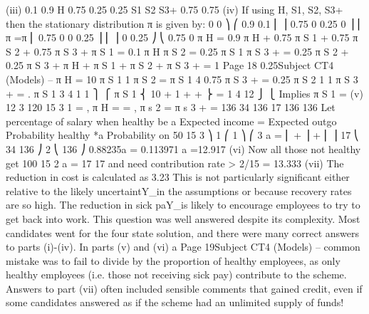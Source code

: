 (iii)
0.1
0.9
H
0.75
0.25
0.25
S1
S2
S3+
0.75
0.75
(iv)
If using H, S1, S2, S3+ then the stationary distribution π is given by:
0
0 ⎞
⎛ 0.9 0.1
⎜
⎟
0.75 0 0.25
0 ⎟
⎜
π
=π
⎜ 0.75 0
0
0.25 ⎟
⎜
⎟
0
0.25 ⎠
⎝ 0.75 0
π H = 0.9 π H + 0.75 π S 1 + 0.75 π S 2 + 0.75 π S 3 +
π S 1 = 0.1 π H
π S 2 = 0.25 π S 1
π S 3 + = 0.25 π S 2 + 0.25 π S 3 +
π H + π S 1 + π S 2 + π S 3 + = 1
Page 18
0.25Subject CT4 (Models) – %
π H = 10 π S 1
1
π S 2 = π S 1
4
0.75 π S 3 + = 0.25 π S 2
1 1
π S 3 + = . π S 1
3 4
1 1 ⎫
⎧
π S 1 ⎨ 10 + 1 + + ⎬ = 1
4 12 ⎭
⎩
Implies
π S 1 =
(v)
12
3
120 15
3
1
= , π H =
= , π s 2 =
π s 3 + =
136 34
136 17
136
136
Let percentage of salary when healthy be a%
Expected income = Expected outgo
Probability healthy *a%
Probability on 50%
15
3 ⎞ 1 ⎛ 1 ⎞
⎛ 3
a = ⎜ +
⎟ + ⎜
⎟
17
⎝ 34 136 ⎠ 2 ⎝ 136 ⎠
0.88235a = 0.113971
a =12.917%
(vi)
Now all those not healthy get 100%
15
2
a =
17
17
and need contribution rate > 2/15 = 13.333%
(vii)
The reduction in cost is calculated as 3.23%
This is not particularly significant either relative to the likely uncertaintY_in the
assumptions or because recovery rates are so high.
The reduction in sick paY_is likely to encourage employees to try to get back into
work.
This question was well answered despite its complexity. Most candidates went for the four
state solution, and there were many correct answers to parts (i)-(iv). In parts (v) and (vi) a
Page 19Subject CT4 (Models) – %
common mistake was to fail to divide by the proportion of healthy employees, as only healthy
employees (i.e. those not receiving sick pay) contribute to the scheme. Answers to part (vii)
often included sensible comments that gained credit, even if some candidates answered as if
the scheme had an unlimited supply of funds!

